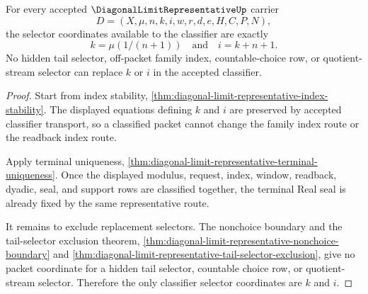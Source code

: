 \begin{theorem}
\label{thm:diagonal-limit-representative-selector-exactness}
For every accepted $\DiagonalLimitRepresentativeUp$ carrier
$$
D=(X,\mu,n,k,i,w,r,d,e,H,C,P,N),
$$
the selector coordinates available to the classifier are exactly
$$
k=\mu(1/(n+1))
\quad\text{and}\quad
i=k+n+1.
$$
No hidden tail selector, off-packet family index, countable-choice row, or quotient-stream selector can replace $k$ or $i$ in the accepted classifier.
\end{theorem}
\begin{proof}
Start from index stability, \autoref{thm:diagonal-limit-representative-index-stability}. The displayed equations defining $k$ and $i$ are preserved by accepted classifier transport, so a classified packet cannot change the family index route or the readback index route.

Apply terminal uniqueness, \autoref{thm:diagonal-limit-representative-terminal-uniqueness}. Once the displayed modulus, request, index, window, readback, dyadic, seal, and support rows are classified together, the terminal Real seal is already fixed by the same representative route.

It remains to exclude replacement selectors. The nonchoice boundary and the tail-selector exclusion theorem, \autoref{thm:diagonal-limit-representative-nonchoice-boundary} and \autoref{thm:diagonal-limit-representative-tail-selector-exclusion}, give no packet coordinate for a hidden tail selector, countable choice row, or quotient-stream selector. Therefore the only classifier selector coordinates are $k$ and $i$.
\end{proof}

